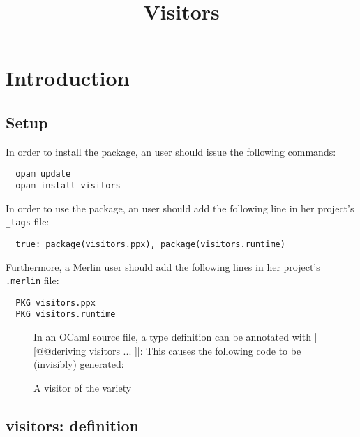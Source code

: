 \documentclass[onecolumn,11pt,nocopyrightspace]{sigplanconf}
\title{Visitors}
\begin{document}
\maketitle


\clearpage


\section{Introduction}
\label{sec:intro}

\subsection{Setup}
\label{sec:intro:setup}

In order to install the \visitors package, an \opam user should issue the
following commands:
\begin{verbatim}
  opam update
  opam install visitors
\end{verbatim}
In order to use the \visitors package, an \ocamlbuild user should add the
following line in her project's \texttt{\_tags} file:
\begin{lstlisting}
  true: package(visitors.ppx), package(visitors.runtime)
\end{lstlisting}
Furthermore, a Merlin user should add the following lines in her project's
\texttt{.merlin} file:
\begin{lstlisting}
  PKG visitors.ppx
  PKG visitors.runtime
\end{lstlisting}


\begin{figure}[t]
In an OCaml source file, a type definition can be annotated with
\oc|[@@deriving visitors { ... }]|:
This causes the following code to be (invisibly) generated:
\caption{A visitor of the \iter variety}
\label{fig:expr00}
\end{figure}

\subsection{\iter visitors: definition}
\label{sec:intro:iter:def}
\end{document}

